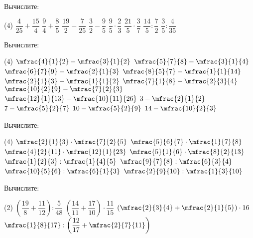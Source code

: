 %
%

\begin{class}[number=1]
	\begin{listofex}
		\item Вычислите:
		\begin{tasks}(4)
			\task \( \dfrac{4}{25}+\dfrac{15}{4} \)
			\task \( \dfrac{9}{4}+\dfrac{8}{5} \)
			\task \( \dfrac{19}{2}-\dfrac{7}{25} \)
			\task \( \dfrac{3}{2}-\dfrac{9}{5} \)
			\task \( \dfrac{9}{5}\cdot\dfrac{2}{3} \)
			\task \( \dfrac{21}{5}\cdot\dfrac{3}{7} \)
			\task \( \dfrac{14}{5}:\dfrac{7}{2} \)
			\task \( \dfrac{3}{5}:\dfrac{4}{35} \)
		\end{tasks}
		\item Вычислите:
		\begin{tasks}(4)
			\task \( \mfrac{4}{1}{2}-\mfrac{3}{1}{2} \)
			\task \( \mfrac{5}{7}{8}-\mfrac{3}{1}{4} \)
			\task \( \mfrac{6}{7}{9}-\mfrac{2}{1}{3} \)
			\task \( \mfrac{8}{5}{7}-\mfrac{1}{1}{14} \)
			\task \( \mfrac{2}{1}{3}-\mfrac{1}{1}{2} \)
			\task \( \mfrac{7}{1}{8}-\mfrac{2}{3}{4} \)
			\task \( \mfrac{10}{2}{9}-\mfrac{7}{2}{3} \)
			\task \( \mfrac{12}{1}{13}-\mfrac{10}{11}{26} \)
			\task \( 3-\mfrac{2}{1}{2} \)
			\task \( 7-\mfrac{5}{2}{7} \)
			\task \( 10-\mfrac{5}{2}{9} \)
			\task \( 14-\mfrac{10}{2}{3} \)
		\end{tasks}
		\item Вычислите:
		\begin{tasks}(4)
			\task \( \mfrac{2}{1}{3}\cdot\mfrac{7}{2}{5} \)
			\task \( \mfrac{5}{6}{7}\cdot\mfrac{1}{7}{8} \)
			\task \( \mfrac{4}{2}{11}\cdot\mfrac{12}{1}{23} \)
			\task \( \mfrac{5}{1}{6}\cdot\mfrac{8}{2}{13} \)
			\task \( \mfrac{1}{2}{3}:\mfrac{1}{4}{5} \)
			\task \( \mfrac{9}{7}{8}:\mfrac{6}{3}{4} \)
			\task \( \mfrac{10}{5}{6}:\mfrac{6}{1}{3} \)
			\task \( \mfrac{2}{9}{10}:\mfrac{1}{3}{10} \)
		\end{tasks}
		\item Вычислите:
		\begin{tasks}(2)
			\task \( \left( \dfrac{19}{8}+\dfrac{11}{12} \right):\dfrac{5}{48} \)
			\task \( \left( \dfrac{14}{11}+\dfrac{17}{10} \right)\cdot\dfrac{11}{15} \)
			\task \( \left( \mfrac{2}{3}{4}+\mfrac{2}{1}{5} \right)\cdot16 \)
			\task \( \mfrac{1}{8}{17}:\left( \dfrac{12}{17}+\mfrac{2}{7}{11} \right) \)
		\end{tasks}
	\end{listofex}
\end{class}

